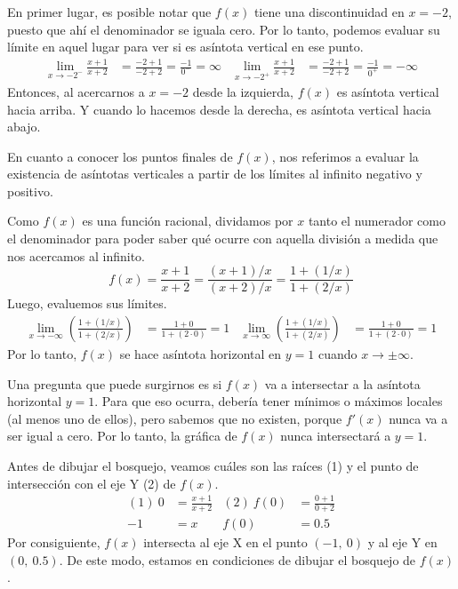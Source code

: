 \documentclass[12pt]{article}
\begin{document}
En primer lugar, es posible notar que $f(x)$ tiene una discontinuidad en $x = -2$, puesto que ahí el denominador se iguala cero. Por lo tanto, podemos evaluar su límite en aquel lugar para ver si es asíntota vertical en ese punto.
\begin{align*}
\lim_{x \to -2^{-}} \frac{x + 1}{x + 2} &= 
		\frac{-2 + 1}{-2 + 2}
		= \frac{-1}{0^{-}}
		= \infty
&
\lim_{x \to -2^{+}} \frac{x + 1}{x + 2} &= 
		\frac{-2 + 1}{-2 + 2}
		= \frac{-1}{0^{+}}
		= -\infty
\end{align*}
Entonces, al acercarnos a $x = -2$ desde la izquierda, $f(x)$ es asíntota vertical hacia arriba. Y cuando lo hacemos desde la derecha, es asíntota vertical hacia abajo.

En cuanto a conocer los puntos finales de $f(x)$, nos referimos a evaluar la existencia de asíntotas verticales a partir de los límites al infinito negativo y positivo.

Como $f(x)$ es una función racional, dividamos por $x$ tanto el numerador como el denominador para poder saber qué ocurre con aquella división a medida que nos acercamos al infinito.
\[
	f(x) = \frac{x + 1}{x + 2} =
	       \frac{(x + 1)/x}{(x + 2)/x} =
	       \frac{1 + (1/x)}{1 + (2/x)}
\]
Luego, evaluemos sus límites.
\begin{align*}
\lim_{x \to -\infty} \left(\frac{1 + (1/x)}{1 + (2/x)}\right) &=
	\frac{1 + 0}{1 + (2 \cdot 0)} = 1
&
\lim_{x \to \infty} \left(\frac{1 + (1/x)}{1 + (2/x)}\right) &=
	\frac{1 + 0}{1 + (2 \cdot 0)} = 1
\end{align*}
Por lo tanto, $f(x)$ se hace asíntota horizontal en $y = 1$ cuando $x \to \pm \infty$.

Una pregunta que puede surgirnos es si $f(x)$ va a intersectar a la asíntota horizontal $y = 1$. Para que eso ocurra, debería tener mínimos o máximos locales (al menos uno de ellos), pero sabemos que no existen, porque $f'(x)$ nunca va a ser igual a cero. Por lo tanto, la gráfica de $f(x)$ nunca intersectará a $y = 1$.

Antes de dibujar el bosquejo, veamos cuáles son las raíces (1) y el punto de intersección con el eje Y (2) de $f(x)$.
\begin{align*}
(1) \ 0 &= \frac{x + 1}{x + 2} & (2) \ f(0) &= \frac{0 + 1}{0 + 2} \\
	 -1 &= x & f(0) &= 0.5
\end{align*}
Por consiguiente, $f(x)$ intersecta al eje X en el punto $(-1, \ 0)$ y al eje Y en $(0, \ 0.5)$. De este modo, estamos en condiciones de dibujar el bosquejo de $f(x)$.
\end{document}
